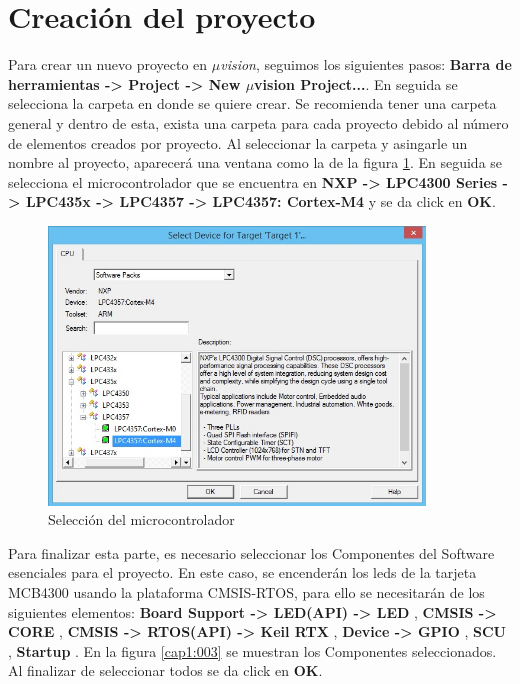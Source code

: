 \documentclass[12pt, twoside]{report}
\begin{document}
\section{Creación del proyecto}

Para crear un nuevo proyecto en \textit{$\mu$vision}, seguimos los siguientes pasos: \textbf{Barra de herramientas -> Project -> New $\mu$vision Project...}. En seguida se selecciona la carpeta en donde se quiere crear. Se recomienda tener una carpeta general y dentro de esta, exista una carpeta para cada proyecto debido al número de elementos creados por proyecto. Al seleccionar la carpeta y asingarle un nombre al proyecto, aparecerá una ventana como la de la figura \ref{cap1:002}. En seguida se selecciona el microcontrolador que se encuentra en \textbf{NXP -> LPC4300 Series -> LPC435x -> LPC4357 -> LPC4357: Cortex-M4} y se da click en \textbf{OK}.

\begin{figure}[H]
	\centering
	\includegraphics[width=100mm]{selecmicro}
	\caption{Selección del microcontrolador}
	\label{cap1:002}
\end{figure}

Para finalizar esta parte, es necesario seleccionar los Componentes del Software esenciales para el proyecto. En este caso, se encenderán los leds de la tarjeta MCB4300 usando la plataforma CMSIS-RTOS, para ello se necesitarán de los siguientes elementos: \textbf{Board Support -> LED(API) -> LED} , \textbf{CMSIS -> CORE} , \textbf{CMSIS -> RTOS(API) -> Keil RTX} , \textbf{Device -> GPIO} , \textbf{SCU} , \textbf{Startup} . En la figura \ref{cap1:003} se muestran los Componentes seleccionados. Al finalizar de seleccionar todos se da click en \textbf{OK}.
\end{document}
